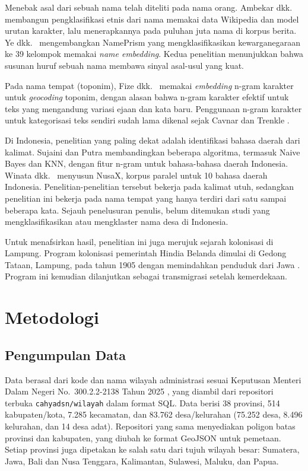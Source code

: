 \documentclass[conference]{IEEEtran}
\begin{document}
Menebak asal dari sebuah nama telah diteliti pada nama orang. Ambekar dkk.\ \cite{ambekar2009} membangun pengklasifikasi etnis dari nama memakai data Wikipedia dan model urutan karakter, lalu menerapkannya pada puluhan juta nama di korpus berita. Ye dkk.\ \cite{ye2017} mengembangkan NamePrism yang mengklasifikasikan kewarganegaraan ke 39 kelompok memakai \textit{name embedding}. Kedua penelitian menunjukkan bahwa susunan huruf sebuah nama membawa sinyal asal-usul yang kuat.

Pada nama tempat (toponim), Fize dkk.\ \cite{fize2021} memakai \textit{embedding} n-gram karakter untuk \textit{geocoding} toponim, dengan alasan bahwa n-gram karakter efektif untuk teks yang mengandung variasi ejaan dan kata baru. Penggunaan n-gram karakter untuk kategorisasi teks sendiri sudah lama dikenal sejak Cavnar dan Trenkle \cite{cavnar1994}.

Di Indonesia, penelitian yang paling dekat adalah identifikasi bahasa daerah dari kalimat. Sujaini dan Putra \cite{sujaini2024} membandingkan beberapa algoritma, termasuk Naive Bayes dan KNN, dengan fitur n-gram untuk bahasa-bahasa daerah Indonesia. Winata dkk.\ \cite{winata2023} menyusun NusaX, korpus paralel untuk 10 bahasa daerah Indonesia. Penelitian-penelitian tersebut bekerja pada kalimat utuh, sedangkan penelitian ini bekerja pada nama tempat yang hanya terdiri dari satu sampai beberapa kata. Sejauh penelusuran penulis, belum ditemukan studi yang mengklasifikasikan atau mengklaster nama desa di Indonesia.

Untuk menafsirkan hasil, penelitian ini juga merujuk sejarah kolonisasi di Lampung. Program kolonisasi pemerintah Hindia Belanda dimulai di Gedong Tataan, Lampung, pada tahun 1905 dengan memindahkan penduduk dari Jawa \cite{sudarno2018}. Program ini kemudian dilanjutkan sebagai transmigrasi setelah kemerdekaan.

\section{Metodologi}

\subsection{Pengumpulan Data}

Data berasal dari kode dan nama wilayah administrasi sesuai Keputusan Menteri Dalam Negeri No.\ 300.2.2-2138 Tahun 2025 \cite{kepmendagri2025}, yang diambil dari repositori terbuka \texttt{cahyadsn/wilayah} \cite{cahyadsn} dalam format SQL. Data berisi 38 provinsi, 514 kabupaten/kota, 7.285 kecamatan, dan 83.762 desa/kelurahan (75.252 desa, 8.496 kelurahan, dan 14 desa adat). Repositori yang sama menyediakan poligon batas provinsi dan kabupaten, yang diubah ke format GeoJSON untuk pemetaan. Setiap provinsi juga dipetakan ke salah satu dari tujuh wilayah besar: Sumatera, Jawa, Bali dan Nusa Tenggara, Kalimantan, Sulawesi, Maluku, dan Papua.
\end{document}

